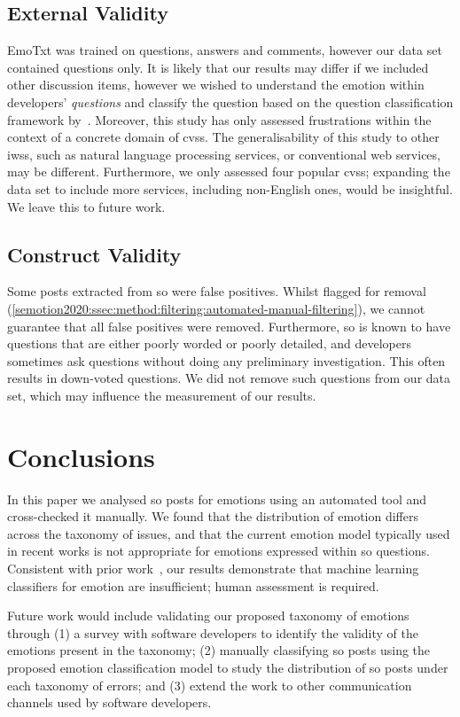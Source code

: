 \subsection{External Validity}
EmoTxt was trained on questions, answers and comments, however our data set contained questions only. It is likely that our results may differ if we included other discussion items, however we wished to understand the emotion within developers' \textit{questions} and classify the question based on the question classification framework by~\citet{Beyer:2018fm}. Moreover, this study has only assessed frustrations within the context of a concrete domain of \glspl{cvs}. The generalisability of this study to other \glspl{iws}, such as natural language processing services, or conventional web services, may be different. Furthermore, we only assessed four popular \glspl{cvs}; expanding the data set to include more services, including non-English ones, would be insightful. We leave this to future work.

\subsection{Construct Validity}
Some posts extracted from \gls{so} were false positives. Whilst flagged for removal (\cref{semotion2020:ssec:method:filtering:automated-manual-filtering}), we cannot guarantee that all false positives were removed. Furthermore, \gls{so} is known to have questions that are either poorly worded or poorly detailed, and developers sometimes ask questions without doing any preliminary investigation. This often results in down-voted questions. We did not remove such questions from our data set, which may influence the measurement of our results.


\section{Conclusions}\label{semotion2020:sec:conclusion}

In this paper we analysed \gls{so} posts for emotions using an automated tool and cross-checked it manually. We found that the distribution of emotion differs across the taxonomy of issues, and that the current emotion model typically used in recent works is not appropriate for emotions expressed within \gls{so} questions. Consistent with prior work~\citep{lin2018sentiment}, our results demonstrate that machine learning classifiers for emotion are insufficient; human assessment is required.

Future work would include validating our proposed taxonomy of emotions through (1) a survey with software developers to identify the validity of the emotions present in the taxonomy; (2) manually classifying \gls{so} posts using the proposed emotion classification model to study the distribution of \gls{so} posts under each taxonomy of errors; and (3) extend the work to other communication channels used by software developers. 